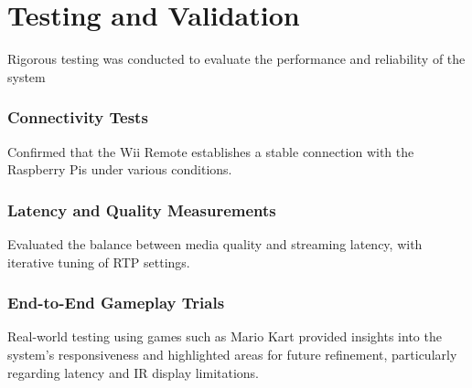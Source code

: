 \section{Testing and Validation}
Rigorous testing was conducted to evaluate the performance and reliability of the system

\subsubsection*{Connectivity Tests}
Confirmed that the Wii Remote establishes a stable connection with the Raspberry Pis under various conditions.

\subsubsection*{Latency and Quality Measurements}
Evaluated the balance between media quality and streaming latency, with iterative tuning of RTP settings.

\subsubsection*{End-to-End Gameplay Trials}
Real-world testing using games such as Mario Kart provided insights into the system’s responsiveness and highlighted areas for future refinement, particularly regarding latency and IR display limitations.

